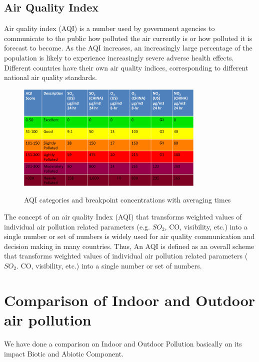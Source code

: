 \subsection{Air Quality Index}
Air quality index (AQI) is a number used by government agencies  to communicate to the public how polluted the air currently is or how polluted it is forecast to become. As the AQI increases, an increasingly large percentage of the population is likely to experience increasingly severe adverse health effects. Different countries have their own air quality indices, corresponding to different national air quality standards.

\begin{figure}[h]
\centering
  \includegraphics[width=0.8\textwidth]{./AQI}\\[0.1in]
  \caption{AQI categories and breakpoint concentrations with averaging times \cite{10}}
  \label{fig:AQI Category Breakpoint}
\end{figure}


The concept of an air quality Index (AQI) that transforms weighted values of individual air pollution related parameters (e.g. $SO_2$, CO, visibility, etc.) into a single number or set of numbers is widely used for air quality communication and decision making in many countries. Thus, An AQI is defined as an overall scheme that transforms weighted values of individual air pollution related parameters ($SO_2$. CO, visibility, etc.) into a single number or set of numbers.

\section{Comparison of Indoor and Outdoor air pollution}
We have done a comparison on Indoor and Outdoor Pollution basically on its impact Biotic and Abiotic Component.


